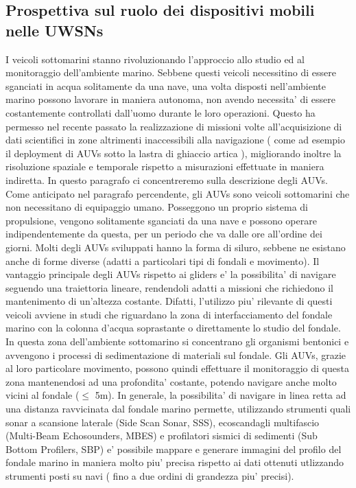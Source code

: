 \documentclass[Lau,binding=0.6cm]{sapthesis}
\begin{document}
\subsection{Prospettiva sul ruolo dei dispositivi mobili nelle UWSNs}
I veicoli sottomarini stanno rivoluzionando l'approccio allo studio ed al monitoraggio dell'ambiente marino. \newline Sebbene questi veicoli necessitino di essere sganciati in acqua solitamente da una nave, una volta disposti nell'ambiente marino possono lavorare in maniera autonoma, non avendo necessita' di essere costantemente controllati dall'uomo durante le loro operazioni. \newline Questo ha permesso nel recente passato la realizzazione di missioni volte all'acquisizione di dati scientifici in zone altrimenti inaccessibili alla navigazione ( come ad esempio il deployment di AUVs sotto la lastra di ghiaccio artica \cite{wadhams}), migliorando inoltre la risoluzione spaziale e temporale rispetto a misurazioni effettuate in maniera indiretta.\newline
In questo paragrafo ci concentreremo sulla descrizione degli AUVs.
Come anticipato nel paragrafo percendente, gli AUVs sono veicoli sottomarini che non necessitano di equipaggio umano. Posseggono un proprio sistema di propulsione, vengono solitamente sganciati da una nave e possono operare indipendentemente da questa, per un periodo che va dalle ore all'ordine dei giorni. Molti degli AUVs sviluppati hanno la forma di siluro, sebbene ne esistano anche di forme diverse (adatti a particolari tipi di fondali e movimento).\newline
Il vantaggio principale degli AUVs rispetto ai gliders e' la possibilita' di navigare seguendo una traiettoria lineare, rendendoli adatti a missioni che richiedono il mantenimento di un'altezza costante.
Difatti, l'utilizzo piu' rilevante di questi veicoli  avviene in studi che riguardano la zona di interfacciamento del fondale marino con la colonna d'acqua soprastante o direttamente lo studio del fondale.  In questa zona dell'ambiente sottomarino si concentrano gli organismi bentonici e avvengono i processi di sedimentazione di materiali sul fondale. 
Gli AUVs, grazie al loro particolare movimento, possono quindi effettuare il monitoraggio di questa zona mantenendosi ad una profondita' costante, potendo navigare anche molto vicini al fondale ($\leq$ 5m). \newline
In generale, la possibilita' di navigare in linea retta ad una distanza ravvicinata dal fondale marino permette, utilizzando strumenti quali sonar a scansione laterale (Side Scan Sonar, SSS), ecoscandagli multifascio (Multi-Beam Echosounders, MBES) e profilatori sismici di sedimenti (Sub Bottom Profilers, SBP) e' possibile mappare e generare immagini del profilo del fondale marino in maniera molto piu' precisa rispetto ai dati ottenuti utlizzando strumenti posti su navi ( fino a due ordini di grandezza piu' precisi). \newline 
\end{document}
